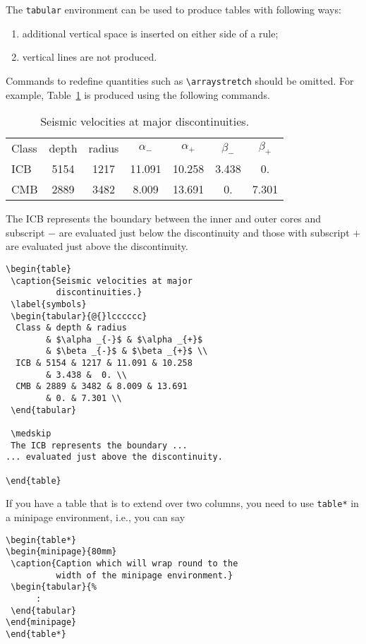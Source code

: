 The \verb"tabular" environment can be used to produce tables with
following ways:
\begin{enumerate}
  \item additional vertical space is inserted on either side of a rule;
  \item vertical lines are not produced.
\end{enumerate}
Commands to redefine quantities such as \verb"\arraystretch" should be
omitted. For example, Table~\ref{symbols} is produced using the
following commands.
\begin{table}
 \caption{Seismic velocities at major discontinuities.}\label{symbols}
 \begin{tabular}{@{}lcccccc}
  Class & depth & radius
        & $\alpha _{-}$ & $\alpha _{+}$
        & $\beta _{-}$ & $\beta _{+}$ \\
  ICB & 5154 & 1217 & 11.091 & 10.258
        & 3.438 &  0. \\
  CMB & 2889 & 3482 & 8.009 & 13.691
        & 0. & 7.301 \\
 \end{tabular}

 \medskip
 The ICB represents the boundary between the inner and outer cores and
subscript $-$ are evaluated just below the discontinuity and
those with subscript $+$ are evaluated just above the discontinuity.
\end{table}
\begin{verbatim}
\begin{table}
 \caption{Seismic velocities at major
          discontinuities.}
 \label{symbols}
 \begin{tabular}{@{}lcccccc}
  Class & depth & radius
        & $\alpha _{-}$ & $\alpha _{+}$
        & $\beta _{-}$ & $\beta _{+}$ \\
  ICB & 5154 & 1217 & 11.091 & 10.258
        & 3.438 &  0. \\
  CMB & 2889 & 3482 & 8.009 & 13.691
        & 0. & 7.301 \\
 \end{tabular}

 \medskip
 The ICB represents the boundary ...
... evaluated just above the discontinuity.

\end{table}
\end{verbatim}

If you have a table that is to extend over two columns, you need to use
\verb"table*" in a minipage environment, i.e., you can say
\begin{verbatim}
\begin{table*}
\begin{minipage}{80mm}
 \caption{Caption which will wrap round to the
          width of the minipage environment.}
 \begin{tabular}{%
      :
 \end{tabular}
\end{minipage}
\end{table*}
\end{verbatim}

